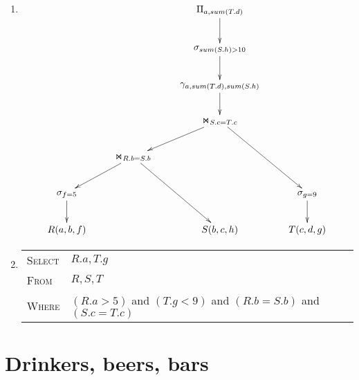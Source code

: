 \documentclass[12pt]{article}
\begin{document}
\begin{enumerate}
\item %

\begin{displaymath}
\xymatrix{
 & & \Pi_{a,sum(T.d)} \ar[d] & \\
 & & \sigma_{sum(S.h) > 10} \ar[d] & \\
 & & \gamma_{a, sum(T.d), sum(S.h)} \ar[d] & \\
 & & \Join_{S.c = T.c} \ar[dl] \ar[ddr] &\\
 & \Join_{R.b=S.b} \ar[dl] \ar[ddr] & &\\
\sigma_{f=5} \ar[d] & &          & \sigma_{g=9} \ar[d] \\
R(a,b,f)            & & S(b,c,h) & T(c,d,g)
}
\end{displaymath}

\item %
\begin{center}
\begin{tabular}[t]{ll}
\textsc{Select} & $R.a, T.g$\\
\textsc{From}   & $R,S,T$\\
\textsc{Where}  & $(R.a > 5)$ and $(T.g < 9)$ and $(R.b=S.b)$ and $(S.c=T.c)$
\end{tabular}
\end{center}

\end{enumerate}

\pagebreak

\section{Drinkers, beers, bars}
\end{document}
